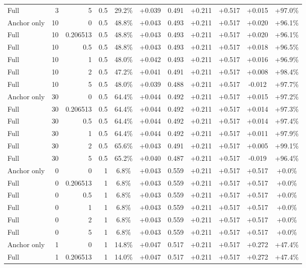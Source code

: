 \begin{table}[htbp]
\begin{tabular}{lrrrccccccc}
Full & 3 & 5 & 0.5 & 29.2\% & +0.039 & 0.491 & +0.211 & +0.517 & +0.015 & +97.0\% \\
Anchor only & 10 & 0 & 0.5 & 48.8\% & +0.043 & 0.493 & +0.211 & +0.517 & +0.020 & +96.1\% \\
Full & 10 & 0.206513 & 0.5 & 48.8\% & +0.043 & 0.493 & +0.211 & +0.517 & +0.020 & +96.1\% \\
Full & 10 & 0.5 & 0.5 & 48.8\% & +0.043 & 0.493 & +0.211 & +0.517 & +0.018 & +96.5\% \\
Full & 10 & 1 & 0.5 & 48.0\% & +0.042 & 0.493 & +0.211 & +0.517 & +0.016 & +96.9\% \\
Full & 10 & 2 & 0.5 & 47.2\% & +0.041 & 0.491 & +0.211 & +0.517 & +0.008 & +98.4\% \\
Full & 10 & 5 & 0.5 & 48.0\% & +0.039 & 0.488 & +0.211 & +0.517 & -0.012 & +97.7\% \\
Anchor only & 30 & 0 & 0.5 & 64.4\% & +0.044 & 0.492 & +0.211 & +0.517 & +0.015 & +97.2\% \\
Full & 30 & 0.206513 & 0.5 & 64.4\% & +0.044 & 0.492 & +0.211 & +0.517 & +0.014 & +97.3\% \\
Full & 30 & 0.5 & 0.5 & 64.4\% & +0.044 & 0.492 & +0.211 & +0.517 & +0.014 & +97.4\% \\
Full & 30 & 1 & 0.5 & 64.4\% & +0.044 & 0.492 & +0.211 & +0.517 & +0.011 & +97.9\% \\
Full & 30 & 2 & 0.5 & 65.6\% & +0.043 & 0.491 & +0.211 & +0.517 & +0.005 & +99.1\% \\
Full & 30 & 5 & 0.5 & 65.2\% & +0.040 & 0.487 & +0.211 & +0.517 & -0.019 & +96.4\% \\
Anchor only & 0 & 0 & 1 & 6.8\% & +0.043 & 0.559 & +0.211 & +0.517 & +0.517 & +0.0\% \\
Full & 0 & 0.206513 & 1 & 6.8\% & +0.043 & 0.559 & +0.211 & +0.517 & +0.517 & +0.0\% \\
Full & 0 & 0.5 & 1 & 6.8\% & +0.043 & 0.559 & +0.211 & +0.517 & +0.517 & +0.0\% \\
Full & 0 & 1 & 1 & 6.8\% & +0.043 & 0.559 & +0.211 & +0.517 & +0.517 & +0.0\% \\
Full & 0 & 2 & 1 & 6.8\% & +0.043 & 0.559 & +0.211 & +0.517 & +0.517 & +0.0\% \\
Full & 0 & 5 & 1 & 6.8\% & +0.043 & 0.559 & +0.211 & +0.517 & +0.517 & +0.0\% \\
Anchor only & 1 & 0 & 1 & 14.8\% & +0.047 & 0.517 & +0.211 & +0.517 & +0.272 & +47.4\% \\
Full & 1 & 0.206513 & 1 & 14.0\% & +0.047 & 0.517 & +0.211 & +0.517 & +0.272 & +47.4\% \\

\end{tabular}
\end{table}
